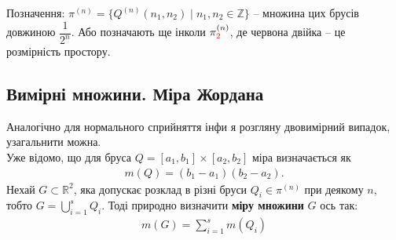 \documentclass[a4paper, 10pt]{article}
\theoremstyle{theoremdd}
\theoremstyle{theoremdd}
\theoremstyle{theoremdd}
\theoremstyle{theoremdd}
\theoremstyle{theoremdd}
\theoremstyle{theoremdd}
\theoremstyle{theoremdd}
\theoremstyle{theoremdd}
\theoremstyle{theoremdd}
\theoremstyle{theoremdd}
\theoremstyle{theoremdd}
\theoremstyle{theoremdd}
\theoremstyle{theoremdd}
\theoremstyle{theoremdd}
\theoremstyle{theoremdd}
\begin{document}
Позначення: $\pi^{(n)} = \{ Q^{(n)}(n_1,n_2) \mid n_1,n_2 \in \mathbb{Z}\}$ -- множина цих брусів довжиною $\dfrac{1}{2^n}$. Або позначають ще інколи $\pi^{(n)}_{\textcolor{red}{2}}$, де червона двійка -- це розмірність простору.

\subsection{Вимірні множини. Міра Жордана}
Аналогічно для нормального сприйняття інфи я розгляну двовимірний випадок, узагальнити можна.\\
Уже відомо, що для бруса $Q = [a_1,b_1] \times [a_2,b_2]$ міра визначається як
\begin{align*} 
m(Q) = (b_1-a_1)(b_2-a_2).
\end{align*}
Нехай $G \subset \mathbb{R}^2$, яка допускає розклад в різні бруси $Q_i \in \pi^{(n)}$ при деякому $n$, тобто $G = \displaystyle\bigcup_{i=1}^s Q_i$. Тоді природно визначити \textbf{міру множини} $G$ ось так:
\begin{align*}
m(G) = \sum_{i=1}^s m(Q_i)
\end{align*}
\end{document}

